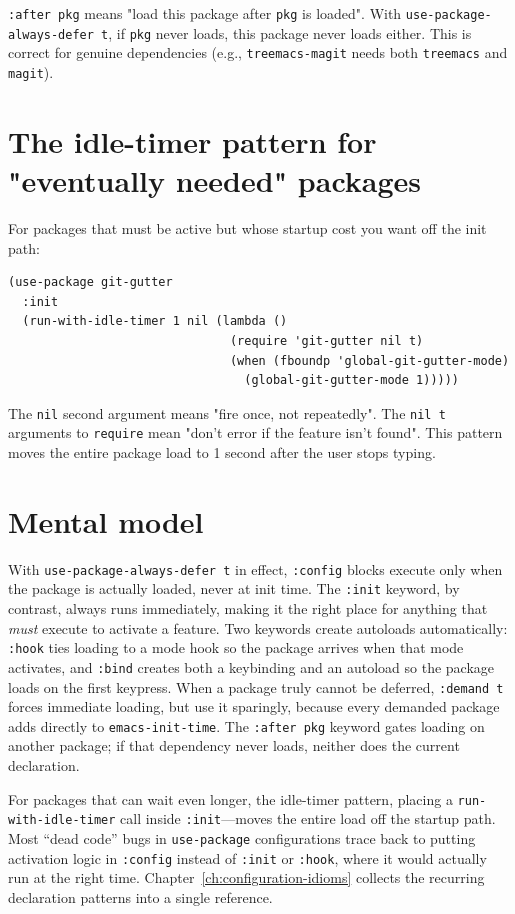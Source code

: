 \texttt{:after pkg} means "load this package after \texttt{pkg} is loaded". With \texttt{use-package-always-defer t}, if \texttt{pkg} never loads, this package never loads either. This is correct for genuine dependencies (e.g., \texttt{treemacs-magit} needs both \texttt{treemacs} and \texttt{magit}).

\section{The idle-timer pattern for "eventually needed" packages}\label{the-idle-timer-pattern-for-eventually-needed-packages}

For packages that must be active but whose startup cost you want off the init path:

\begin{verbatim}
(use-package git-gutter
  :init
  (run-with-idle-timer 1 nil (lambda ()
                               (require 'git-gutter nil t)
                               (when (fboundp 'global-git-gutter-mode)
                                 (global-git-gutter-mode 1)))))
\end{verbatim}

The \texttt{nil} second argument means "fire once, not repeatedly". The \texttt{nil t} arguments to \texttt{require} mean "don't error if the feature isn't found". This pattern moves the entire package load to 1 second after the user stops typing.

\section{Mental model}
With \texttt{use-package-always-defer t} in effect, \texttt{:config}
blocks execute only when the package is actually loaded, never at init
time.  The \texttt{:init} keyword, by contrast, always runs immediately,
making it the right place for anything that \emph{must} execute to
activate a feature.  Two keywords create autoloads automatically:
\texttt{:hook} ties loading to a mode hook so the package arrives when
that mode activates, and \texttt{:bind} creates both a keybinding and an
autoload so the package loads on the first keypress.  When a package
truly cannot be deferred, \texttt{:demand t} forces immediate
loading, but use it sparingly, because every demanded package adds
directly to \texttt{emacs-init-time}.  The \texttt{:after pkg} keyword
gates loading on another package; if that dependency never loads,
neither does the current declaration.

For packages that can wait even longer, the idle-timer pattern, placing
a \texttt{run-with-idle-timer} call inside \texttt{:init}---moves the
entire load off the startup path.  Most ``dead code'' bugs in
\texttt{use-package} configurations trace back to putting activation
logic in \texttt{:config} instead of \texttt{:init} or \texttt{:hook},
where it would actually run at the right time.
Chapter~\ref{ch:configuration-idioms} collects the recurring
declaration patterns into a single reference.
